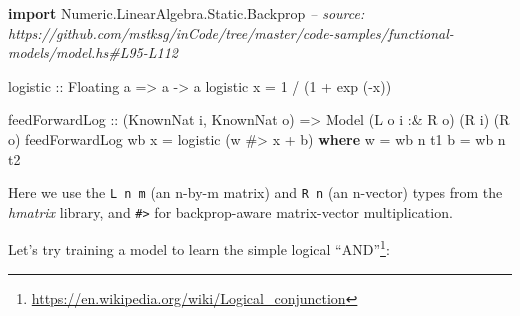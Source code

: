 \documentclass[]{article}
\newenvironment{Shaded}{}{}
\newcommand{\CommentTok}[1]{\textcolor[rgb]{0.38,0.63,0.69}{\textit{#1}}}
\newcommand{\DataTypeTok}[1]{\textcolor[rgb]{0.56,0.13,0.00}{#1}}
\newcommand{\DecValTok}[1]{\textcolor[rgb]{0.25,0.63,0.44}{#1}}
\newcommand{\FunctionTok}[1]{\textcolor[rgb]{0.02,0.16,0.49}{#1}}
\newcommand{\KeywordTok}[1]{\textcolor[rgb]{0.00,0.44,0.13}{\textbf{#1}}}
\newcommand{\NormalTok}[1]{#1}
\newcommand{\OtherTok}[1]{\textcolor[rgb]{0.00,0.44,0.13}{#1}}
\renewcommand{\href}[2]{#2\footnote{\url{#1}}}
\begin{document}
\begin{Shaded}
\begin{Highlighting}[]
\KeywordTok{import} \DataTypeTok{Numeric.LinearAlgebra.Static.Backprop}
\CommentTok{-- source: https://github.com/mstksg/inCode/tree/master/code-samples/functional-models/model.hs#L95-L112}

\OtherTok{logistic ::} \DataTypeTok{Floating}\NormalTok{ a }\OtherTok{=>}\NormalTok{ a }\OtherTok{->}\NormalTok{ a}
\NormalTok{logistic x }\FunctionTok{=} \DecValTok{1} \FunctionTok{/}\NormalTok{ (}\DecValTok{1} \FunctionTok{+}\NormalTok{ exp (}\FunctionTok{-}\NormalTok{x))}

\NormalTok{feedForwardLog}
\OtherTok{    ::}\NormalTok{ (}\DataTypeTok{KnownNat}\NormalTok{ i, }\DataTypeTok{KnownNat}\NormalTok{ o)}
    \OtherTok{=>} \DataTypeTok{Model}\NormalTok{ (}\DataTypeTok{L}\NormalTok{ o i }\FunctionTok{:&} \DataTypeTok{R}\NormalTok{ o) (}\DataTypeTok{R}\NormalTok{ i) (}\DataTypeTok{R}\NormalTok{ o)}
\NormalTok{feedForwardLog wb x }\FunctionTok{=}\NormalTok{ logistic (w }\FunctionTok{#>}\NormalTok{ x }\FunctionTok{+}\NormalTok{ b)}
  \KeywordTok{where}
\NormalTok{    w }\FunctionTok{=}\NormalTok{ wb }\FunctionTok{^^.}\NormalTok{ t1}
\NormalTok{    b }\FunctionTok{=}\NormalTok{ wb }\FunctionTok{^^.}\NormalTok{ t2}
\end{Highlighting}
\end{Shaded}

Here we use the \texttt{L\ n\ m} (an n-by-m matrix) and \texttt{R\ n} (an
n-vector) types from the \emph{hmatrix} library, and \texttt{\#\textgreater{}}
for backprop-aware matrix-vector multiplication.

Let's try training a model to learn the simple
\href{https://en.wikipedia.org/wiki/Logical_conjunction}{logical ``AND''}:

\begin{Shaded}
\end{Shaded}
\end{document}
